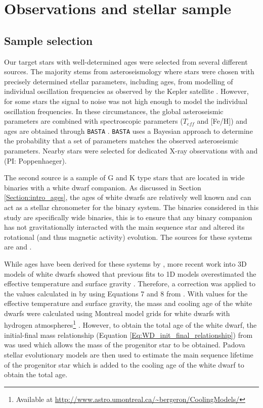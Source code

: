 \section{Observations and stellar sample}
\subsection{Sample selection}
\label{Section_sample_selection}
Our target stars with well-determined ages were selected from several different sources. The majority stems from asteroseismology where stars were chosen with precisely determined stellar parameters, including ages, from modelling of individual oscillation frequencies as observed by the Kepler satellite \citep{Silva_Aguirre_etal_2015,Silva_Aguirre_etal_2017}. However, for some stars the signal to noise was not high enough to model the individual oscillation frequencies. In these circumstances, the global asteroseismic parameters \citep{Chaplin_etal_2014} are combined with spectroscopic parameters ($T_{eff}$ and [Fe/H]) \citep{Buchhave_Latham_2015} and ages are obtained through \texttt{BASTA} \citep{Silva_Aguirre_etal_2015}. \texttt{BASTA} uses a Bayesian approach to determine the probability that a set of parameters matches the observed asteroseismic parameters. Nearby stars were selected for dedicated X-ray observations with \XMM and \Chandra (PI: Poppenhaeger).

The second source is a sample of G and K type stars that are located in wide binaries with a white dwarf companion. As discussed in Section \ref{Section:intro_ages}, the ages of white dwarfs are relatively well known and can act as a stellar chronometer for the binary system. The binaries considered in this study are specifically wide binaries, this is to ensure that any binary companion has not gravitationally interacted with the main sequence star and altered its rotational (and thus magnetic activity) evolution. The sources for these systems are \citet{Garces_etal_2011} and \citet{Zhao_etal_2012}.

While ages have been derived for these systems by \citet{Garces_etal_2011}, more recent work into 3D models of white dwarfs showed that previous fits to 1D models overestimated the effective temperature and surface gravity \citep{Tremblay_etal_2013}. Therefore, a correction was applied to the values calculated in \citet{Garces_etal_2011} by using Equations 7 and 8 from \citet{Tremblay_etal_2013}. With values for the effective temperature and surface gravity, the mass and cooling age of the white dwarfs were calculated using Montreal model grids for white dwarfs with hydrogen atmospheres\footnote{Available at \url{http://www.astro.umontreal.ca/~bergeron/CoolingModels/}} \citep{Holberg_Bergeron_2006,Kowalski_Saumon_2006,Bergeron_etal_2011,Tremblay_etal_2011}. However, to obtain the total age of the white dwarf, the initial-final mass relationship (Equation \ref{Eq:WD_init_final_relationship}) from \citet{Kalirai_etal_2008} was used which allows the mass of the progenitor star to be obtained. Padova stellar evolutionary models \citep{Bertelli_etal_2008} are then used to estimate the main sequence lifetime of the progenitor star which is added to the cooling age of the white dwarf to obtain the total age.

